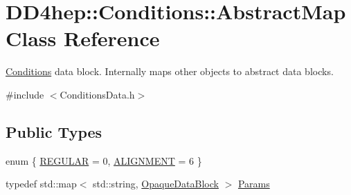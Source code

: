 \hypertarget{class_d_d4hep_1_1_conditions_1_1_abstract_map}{
\section{DD4hep::Conditions::AbstractMap Class Reference}
\label{class_d_d4hep_1_1_conditions_1_1_abstract_map}
}


\hyperlink{namespace_d_d4hep_1_1_conditions}{Conditions} data block. Internally maps other objects to abstract data blocks.  


{\ttfamily \#include $<$ConditionsData.h$>$}\subsection*{Public Types}
\begin{DoxyCompactItemize}
\item 
enum \{ \hyperlink{class_d_d4hep_1_1_conditions_1_1_abstract_map_a77a7651d9ea83e8c83ded9eb6765d532a00ddc93e8ea953666d5b3560926184e7}{REGULAR} =  0, 
\hyperlink{class_d_d4hep_1_1_conditions_1_1_abstract_map_a77a7651d9ea83e8c83ded9eb6765d532a79b94c3c134968d52e05163d53c5b7cc}{ALIGNMENT} =  6
 \}
\item 
typedef std::map$<$ std::string, \hyperlink{class_d_d4hep_1_1_opaque_data_block}{OpaqueDataBlock} $>$ \hyperlink{class_d_d4hep_1_1_conditions_1_1_abstract_map_a0a7595cac22aa8ddc6f6900d7883c2fc}{Params}
\end{DoxyCompactItemize}
